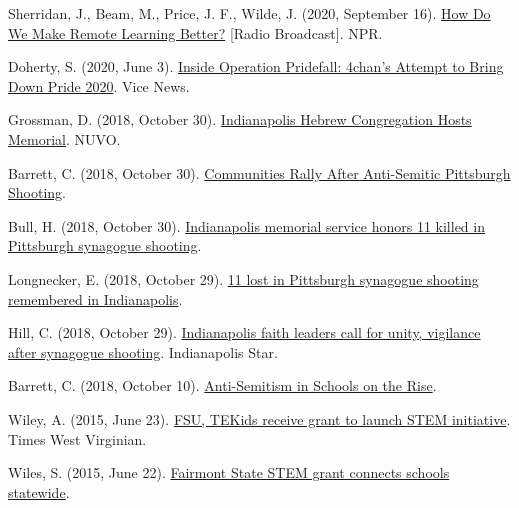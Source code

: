 \documentclass[11pt,article,oneside]{memoir}
\begin{document}
\ind Sherridan, J., Beam, M., Price, J. F., Wilde, J. (2020, September 16). \href{https://www.wfyi.org/programs/all-in/radio/How-Do-We-Make-Remote-Learning-Better}{How Do We Make Remote Learning Better?} [Radio Broadcast]. NPR.

\ind Doherty, S. (2020, June 3). \href{https://www.vice.com/en/article/7kpbba/operation-pridefall-4chan-gay-pride-2020}{Inside Operation Pridefall: 4chan’s Attempt to Bring Down Pride 2020}. Vice News.

\ind Grossman, D. (2018, October 30). \href{https://www.nuvo.net/news/indianapolis-hebrew-congregation-hosts-memorial/article\_a8535dba-dc02-11e8-8fe3-3b450433c062.html}{Indianapolis Hebrew Congregation Hosts Memorial}. NUVO.

\ind Barrett, C. (2018, October 30). \href{https://www.npr.org/podcasts/500005/npr-news-now}{Communities Rally After Anti-Semitic Pittsburgh Shooting}.

\ind Bull, H. (2018, October 30). \href{https://fox59.com/2018/10/29/indianapolis-memorial-service-honors-11-killed-in-pittsburgh-synagogue-shooting/}{Indianapolis memorial service honors 11 killed in Pittsburgh synagogue shooting}.

\ind Longnecker, E. (2018, October 29). \href{https://www.wthr.com/article/11-lost-pittsburgh-synagogue-shooting-remembered-indianapolis}{11 lost in Pittsburgh synagogue shooting remembered in Indianapolis}.

\ind Hill, C. (2018, October 29). \href{https://www.indystar.com/story/news/2018/10/29/indy-faith-leaders-call-unity-after-pittsburgh-synagogue-shooting/1814436002/}{Indianapolis faith leaders call for unity, vigilance after synagogue shooting}. Indianapolis Star.

\ind Barrett, C. (2018, October 10). \href{https://www.wfyi.org/news/articles/anti-semitism-in-schools-on-the-rise}{Anti-Semitism in Schools on the Rise}.

\ind Wiley, A. (2015, June 23). \href{https://www.timeswv.com/news/fsu-tekids-receive-grant-to-launch-stem-initiative/article\_a40e27f6-1961-11e5-b55b-abc0377fd2ff.html
}{FSU, TEKids receive grant to launch STEM initiative}. Times West Virginian.

\ind Wiles, S. (2015, June 22). \href{https://wajr.com/fairmont-state-stem-grant-connects-schools-statewide/}{Fairmont State STEM grant connects schools statewide}.


\end{document}
